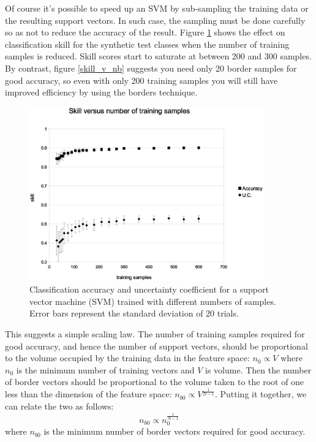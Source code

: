 \documentclass[11pt]{article}
\begin{document}
Of course it's possible to speed up an SVM by sub-sampling the training data
or the resulting support vectors.
In such case, the sampling must be done carefully so as not to reduce the
accuracy of the result.
Figure \ref{skill_v_nt} shows the effect on classification skill for the
synthetic test classes when the number of training samples is reduced.
Skill scores start to saturate at between 200 and 300 samples.
By contrast, figure \ref{skill_v_nb} suggests you need only 20 border samples
for good accuracy, so even with only 200 training samples you will still
have improved efficiency by using the borders technique.

\begin{figure}
\includegraphics[width=0.9\textwidth]{skill_v_nt}
\caption{Classification accuracy and uncertainty coefficient for a support vector machine (SVM) trained with different numbers of samples.
Error bars represent the standard deviation of 20 trials.}
\label{skill_v_nt}
\end{figure}

This suggests a simple scaling law. The number of training samples required
for good accuracy, and hence the number of support vectors, 
should be proportional to the volume occupied by the
training data in the feature space: $n_0 \propto V$ where 
$n_0$ is the minimum number of training vectors and $V$ is volume.
Then the number of border vectors should be proportional to the volume
taken to the root of one less than the dimension of the feature space:
$n_{b0} \propto V^\frac{1}{D-1}$.
Putting it together, we can relate the two as follows:
\begin{equation}
	n_{b0} \propto n_0^\frac{1}{N-1}
\end{equation}
where $n_{b0}$ is the minimum number of border vectors required for good
accuracy.
\end{document}
